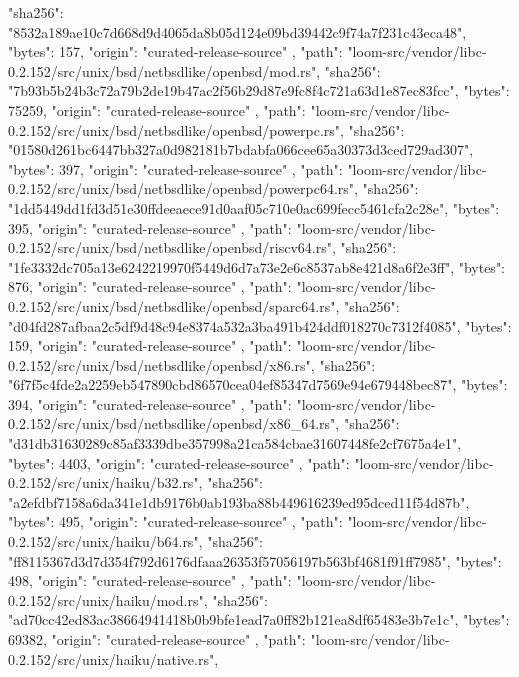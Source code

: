 {{      "sha256": "8532a189ae10c7d668d9d4065da8b05d124e09bd39442c9f74a7f231c43eca48",
      "bytes": 157,
      "origin": "curated-release-source"
    },
    {
      "path": "loom-src/vendor/libc-0.2.152/src/unix/bsd/netbsdlike/openbsd/mod.rs",
      "sha256": "7b93b5b24b3c72a79b2de19b47ac2f56b29d87e9fc8f4c721a63d1e87ec83fcc",
      "bytes": 75259,
      "origin": "curated-release-source"
    },
    {
      "path": "loom-src/vendor/libc-0.2.152/src/unix/bsd/netbsdlike/openbsd/powerpc.rs",
      "sha256": "01580d261bc6447bb327a0d982181b7bdabfa066cee65a30373d3ced729ad307",
      "bytes": 397,
      "origin": "curated-release-source"
    },
    {
      "path": "loom-src/vendor/libc-0.2.152/src/unix/bsd/netbsdlike/openbsd/powerpc64.rs",
      "sha256": "1dd5449dd1fd3d51e30ffdeeaece91d0aaf05c710e0ac699fecc5461cfa2c28e",
      "bytes": 395,
      "origin": "curated-release-source"
    },
    {
      "path": "loom-src/vendor/libc-0.2.152/src/unix/bsd/netbsdlike/openbsd/riscv64.rs",
      "sha256": "1fe3332dc705a13e6242219970f5449d6d7a73e2e6c8537ab8e421d8a6f2e3ff",
      "bytes": 876,
      "origin": "curated-release-source"
    },
    {
      "path": "loom-src/vendor/libc-0.2.152/src/unix/bsd/netbsdlike/openbsd/sparc64.rs",
      "sha256": "d04fd287afbaa2c5df9d48c94e8374a532a3ba491b424ddf018270c7312f4085",
      "bytes": 159,
      "origin": "curated-release-source"
    },
    {
      "path": "loom-src/vendor/libc-0.2.152/src/unix/bsd/netbsdlike/openbsd/x86.rs",
      "sha256": "6f7f5c4fde2a2259eb547890cbd86570cea04ef85347d7569e94e679448bec87",
      "bytes": 394,
      "origin": "curated-release-source"
    },
    {
      "path": "loom-src/vendor/libc-0.2.152/src/unix/bsd/netbsdlike/openbsd/x86_64.rs",
      "sha256": "d31db31630289c85af3339dbe357998a21ca584cbae31607448fe2cf7675a4e1",
      "bytes": 4403,
      "origin": "curated-release-source"
    },
    {
      "path": "loom-src/vendor/libc-0.2.152/src/unix/haiku/b32.rs",
      "sha256": "a2efdbf7158a6da341e1db9176b0ab193ba88b449616239ed95dced11f54d87b",
      "bytes": 495,
      "origin": "curated-release-source"
    },
    {
      "path": "loom-src/vendor/libc-0.2.152/src/unix/haiku/b64.rs",
      "sha256": "ff8115367d3d7d354f792d6176dfaaa26353f57056197b563bf4681f91ff7985",
      "bytes": 498,
      "origin": "curated-release-source"
    },
    {
      "path": "loom-src/vendor/libc-0.2.152/src/unix/haiku/mod.rs",
      "sha256": "ad70cc42ed83ac38664941418b0b9bfe1ead7a0ff82b121ea8df65483e3b7e1c",
      "bytes": 69382,
      "origin": "curated-release-source"
    },
    {
      "path": "loom-src/vendor/libc-0.2.152/src/unix/haiku/native.rs",
}}
